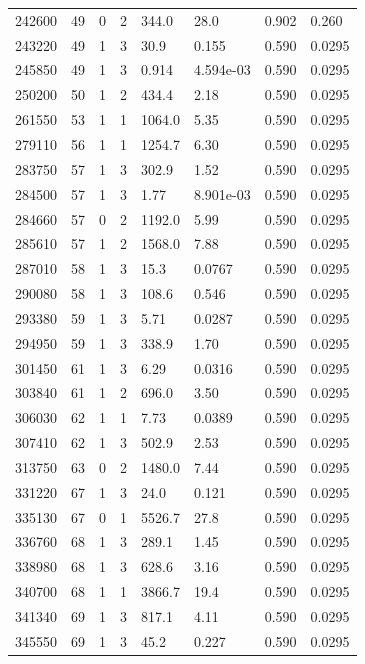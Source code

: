 \documentclass[preview]{standalone}
\begin{document}
{{{\begin{tabular}{L{1.2cm}C{1.2cm} C{0.3cm}C{0.5cm} C{1.4cm}C{1.4cm} C{1.4cm}C{1.4cm}}
  242600  &    49  & 0     &  2 &  344.0  & 28.0  & 0.902 &  0.260   \\ 
  243220  &    49  & 1     &  3 &  30.9  & 0.155  & 0.590 &  0.0295   \\ 
  245850  &    49  & 1     &  3 &  0.914  & 4.594e-03  & 0.590 &  0.0295   \\ 
  250200  &    50  & 1     &  2 &  434.4  & 2.18  & 0.590 &  0.0295   \\ 
  261550  &    53  & 1     &  1 &  1064.0  & 5.35  & 0.590 &  0.0295   \\ 
  279110  &    56  & 1     &  1 &  1254.7  & 6.30  & 0.590 &  0.0295   \\ 
  283750  &    57  & 1     &  3 &  302.9  & 1.52  & 0.590 &  0.0295   \\ 
  284500  &    57  & 1     &  3 &  1.77  & 8.901e-03  & 0.590 &  0.0295   \\ 
  284660  &    57  & 0     &  2 &  1192.0  & 5.99  & 0.590 &  0.0295   \\ 
  285610  &    57  & 1     &  2 &  1568.0  & 7.88  & 0.590 &  0.0295   \\ 
  287010  &    58  & 1     &  3 &  15.3  & 0.0767  & 0.590 &  0.0295   \\ 
  290080  &    58  & 1     &  3 &  108.6  & 0.546  & 0.590 &  0.0295   \\ 
  293380  &    59  & 1     &  3 &  5.71  & 0.0287  & 0.590 &  0.0295   \\ 
  294950  &    59  & 1     &  3 &  338.9  & 1.70  & 0.590 &  0.0295   \\ 
  301450  &    61  & 1     &  3 &  6.29  & 0.0316  & 0.590 &  0.0295   \\ 
  303840  &    61  & 1     &  2 &  696.0  & 3.50  & 0.590 &  0.0295   \\ 
  306030  &    62  & 1     &  1 &  7.73  & 0.0389  & 0.590 &  0.0295   \\ 
  307410  &    62  & 1     &  3 &  502.9  & 2.53  & 0.590 &  0.0295   \\ 
  313750  &    63  & 0     &  2 &  1480.0  & 7.44  & 0.590 &  0.0295   \\ 
  331220  &    67  & 1     &  3 &  24.0  & 0.121  & 0.590 &  0.0295   \\ 
  335130  &    67  & 0     &  1 &  5526.7  & 27.8  & 0.590 &  0.0295   \\ 
  336760  &    68  & 1     &  3 &  289.1  & 1.45  & 0.590 &  0.0295   \\ 
  338980  &    68  & 1     &  3 &  628.6  & 3.16  & 0.590 &  0.0295   \\ 
  340700  &    68  & 1     &  1 &  3866.7  & 19.4  & 0.590 &  0.0295   \\ 
  341340  &    69  & 1     &  3 &  817.1  & 4.11  & 0.590 &  0.0295   \\ 
  345550  &    69  & 1     &  3 &  45.2  & 0.227  & 0.590 &  0.0295   \\ 
\hline 
\end{tabular} 

}}}
\end{document}
